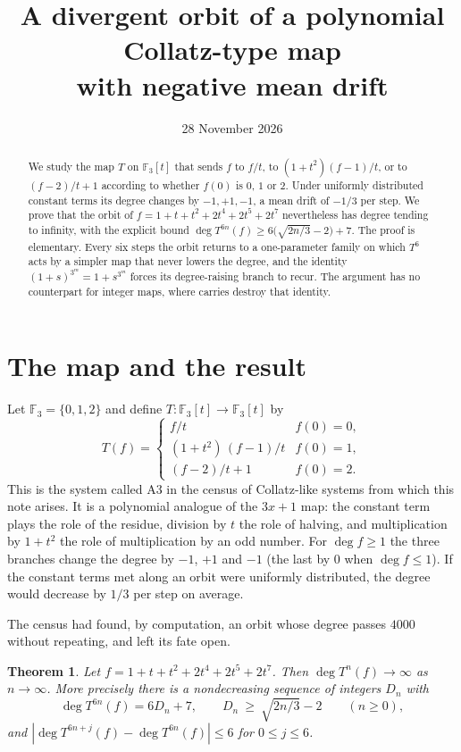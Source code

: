 \documentclass[11pt,a4paper]{article}
\title{A divergent orbit of a polynomial Collatz-type map\\ with negative mean drift}
\author{}\date{28 November 2026}
\newtheorem{theorem}{Theorem}
\theoremstyle{remark}
\newcommand{\F}{\mathbb F}
\begin{document}
\maketitle\vspace{-3em}

\begin{abstract}
We study the map $T$ on $\F_3[t]$ that sends $f$ to $f/t$, to $(1+t^2)(f-1)/t$, or to
$(f-2)/t+1$ according to whether $f(0)$ is $0$, $1$ or $2$. Under uniformly distributed constant
terms its degree changes by $-1,+1,-1$, a mean drift of $-1/3$ per step. We prove that the orbit
of $f=1+t+t^2+2t^4+2t^5+2t^7$ nevertheless has degree tending to infinity, with the explicit
bound $\deg T^{6n}(f)\ge 6\bigl(\sqrt{2n/3}-2\bigr)+7$. The proof is elementary. Every six steps
the orbit returns to a one-parameter family on which $T^6$ acts by a simpler map that never
lowers the degree, and the identity $(1+s)^{3^m}=1+s^{3^m}$ forces its degree-raising branch to
recur. The argument has no counterpart for integer maps, where carries destroy that identity.
\end{abstract}

\section{The map and the result}

Let $\F_3=\{0,1,2\}$ and define $T\colon\F_3[t]\to\F_3[t]$ by
\[
T(f)=\begin{cases}
 f/t & f(0)=0,\\[2pt]
 (1+t^2)\,(f-1)/t & f(0)=1,\\[2pt]
 (f-2)/t+1 & f(0)=2.
\end{cases}
\]
This is the system called A3 in the census of Collatz-like systems from which this note arises.
It is a polynomial analogue of the $3x+1$ map: the constant term plays the role of the residue,
division by $t$ the role of halving, and multiplication by $1+t^2$ the role of multiplication by
an odd number. For $\deg f\ge1$ the three branches change the degree by $-1$, $+1$ and $-1$
(the last by $0$ when $\deg f\le 1$). If the constant terms met along an orbit were uniformly
distributed, the degree would decrease by $1/3$ per step on average.

The census had found, by computation, an orbit whose degree passes $4000$ without repeating, and
left its fate open.

\begin{theorem}\label{thm:main}
Let $f=1+t+t^2+2t^4+2t^5+2t^7$. Then $\deg T^n(f)\to\infty$ as $n\to\infty$. More precisely there
is a nondecreasing sequence of integers $D_n$ with
\[
 \deg T^{6n}(f)=6D_n+7,\qquad D_n\ \ge\ \sqrt{2n/3}-2\qquad(n\ge0),
\]
and $|\deg T^{6n+j}(f)-\deg T^{6n}(f)|\le 6$ for $0\le j\le 6$.
\end{theorem}
\end{document}
